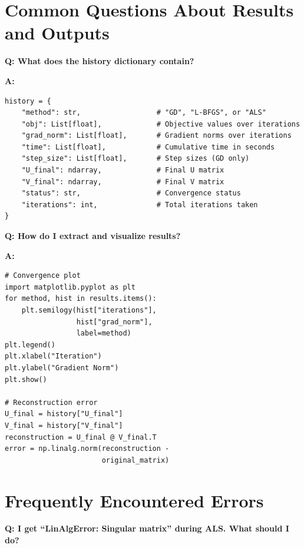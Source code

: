 \documentclass[11pt,oneside]{article}
\newcommand{\question}[1]{\textbf{Q: #1}}
\newcommand{\answer}{\textbf{A: }}
\begin{document}
\section{Common Questions About Results and Outputs}\label{sec:outputs}

\question{What does the history dictionary contain?}

\answer

\begin{lstlisting}
history = {
    "method": str,                  # "GD", "L-BFGS", or "ALS"
    "obj": List[float],             # Objective values over iterations
    "grad_norm": List[float],       # Gradient norms over iterations
    "time": List[float],            # Cumulative time in seconds
    "step_size": List[float],       # Step sizes (GD only)
    "U_final": ndarray,             # Final U matrix
    "V_final": ndarray,             # Final V matrix
    "status": str,                  # Convergence status
    "iterations": int,              # Total iterations taken
}
\end{lstlisting}

\medskip

\question{How do I extract and visualize results?}

\answer

\begin{lstlisting}
# Convergence plot
import matplotlib.pyplot as plt
for method, hist in results.items():
    plt.semilogy(hist["iterations"], 
                 hist["grad_norm"], 
                 label=method)
plt.legend()
plt.xlabel("Iteration")
plt.ylabel("Gradient Norm")
plt.show()

# Reconstruction error
U_final = history["U_final"]
V_final = history["V_final"]
reconstruction = U_final @ V_final.T
error = np.linalg.norm(reconstruction - 
                       original_matrix)
\end{lstlisting}

\section{Frequently Encountered Errors}\label{sec:errors}

\question{I get ``LinAlgError: Singular matrix'' during ALS. What should I do?}
\end{document}
